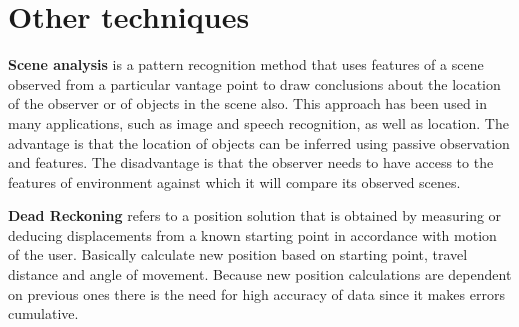 \section{Other techniques}
\textbf{Scene analysis} is a pattern recognition method that uses features of a scene observed from a particular vantage point to draw conclusions about the location of the observer or of objects in the scene also.\cite{LSfUC} This approach has been used in many applications, such as image and speech recognition, as well as location.\cite{LSAWIFI} The advantage is that the location of objects can be inferred using passive observation and features. The disadvantage is that the observer needs to have access to the features of environment against which it will compare its observed scenes.\cite{LSfUC}

\medskip

\textbf{Dead Reckoning} refers to a position solution that is obtained by measuring or deducing displacements from a known starting point in accordance with motion of the user.\cite{DRNS} Basically calculate new position based on starting point, travel distance and angle of movement. Because new position calculations are dependent on previous ones there is the need for high accuracy of data since it makes errors cumulative.\cite{IDRAIP}